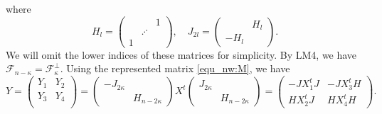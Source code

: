 \documentclass[pdflatex,sn-mathphys-num]{sn-jnl}%
\theoremstyle{thmstyleone}%
\theoremstyle{thmstyletwo}%
\numberwithin{equation}{subsection}
\theoremstyle{thmstylethree}%
\newcommand{\CF}{\ensuremath{\mathcal{F}}\xspace}
\begin{document}
where 
\begin{equation*}
	H_{l}=
    \left(
    \begin{array}{ccc}
	&        &   1\\
	&\iddots &   \\
	1   &        & 
    \end{array}\right),
	\quad
	J_{2l}=
	\left(\begin{matrix}
		&   H_l\\
		-H_l &
		\end{matrix}\right).
\end{equation*}
We will omit the lower indices of these matrices for simplicity.
By {\selectfont LM4}, we have $\CF_{n-\kappa}=\CF_{\kappa}^\perp$. Using the represented matrix \eqref{equ_nw:M}, we have
\begin{equation}\label{equ_nw:Y}
	Y=
	\left(\begin{matrix}
	Y_1 &   Y_2 \\
	Y_3 &   Y_4 \\
\end{matrix}\right)=
\left(\begin{matrix}
	-J_{2\kappa}   &   \\
	&   H_{n-2\kappa}  
\end{matrix}\right)
    X^t
    \left(\begin{matrix}
	J_{2\kappa}    &       \\
	&   H_{n-2\kappa} 
	\end{matrix}\right)
	=
	\left(\begin{matrix}
	-JX_1^t J &   -JX_3^t H  \\
	H X_2^t J   &   HX_4^t H
		\end{matrix}\right).
\end{equation}
\end{document}

